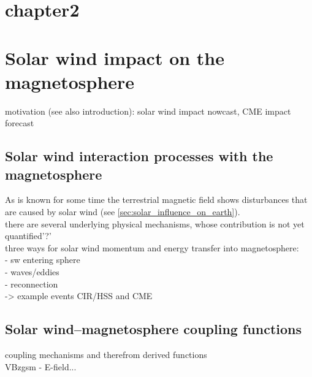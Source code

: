 \chapter{chapter2}

\chapter{Solar wind impact on the magnetosphere}
motivation (see also introduction): solar wind impact nowcast, CME impact forecast\\


\section{Solar wind interaction processes with the magnetosphere}
As is known for some time the terrestrial magnetic field shows disturbances that are caused by solar wind (see \autoref{sec:solar_influence_on_earth}).\\

there are several underlying physical mechanisms, whose contribution is not yet quantified'?'\\

three ways for solar wind momentum and energy transfer into magnetosphere:\\
- sw entering sphere\\
- waves/eddies\\
- reconnection\\


-> example events CIR/HSS and CME\\


\section{Solar wind--magnetosphere coupling functions}
coupling mechanisms and therefrom derived functions\\
VBzgsm - E-field...\\

